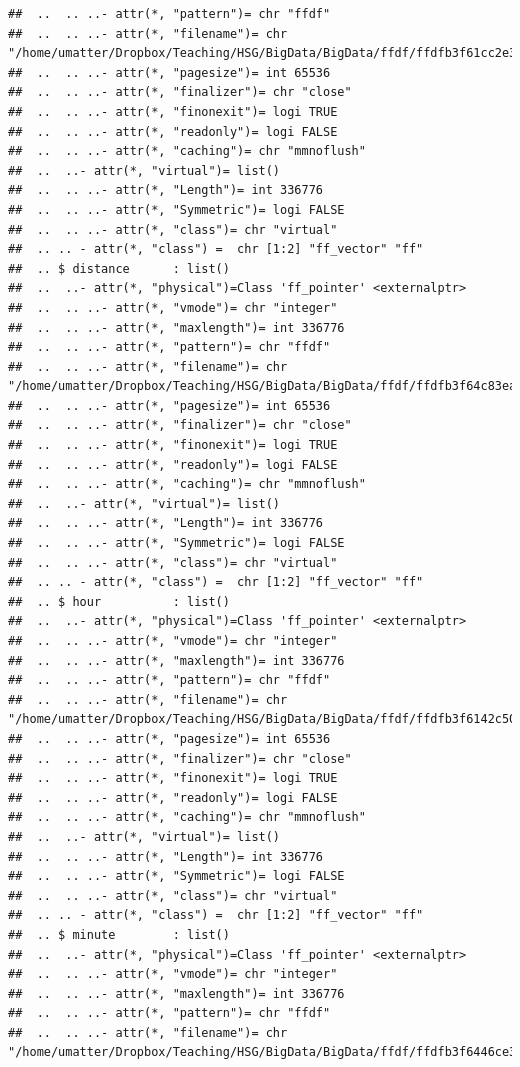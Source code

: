 \documentclass[
  12pt,
]{style/krantz}
\begin{document}
\begin{verbatim}
##  ..  .. ..- attr(*, "pattern")= chr "ffdf"
##  ..  .. ..- attr(*, "filename")= chr "/home/umatter/Dropbox/Teaching/HSG/BigData/BigData/ffdf/ffdfb3f61cc2e3dd.ff"
##  ..  .. ..- attr(*, "pagesize")= int 65536
##  ..  .. ..- attr(*, "finalizer")= chr "close"
##  ..  .. ..- attr(*, "finonexit")= logi TRUE
##  ..  .. ..- attr(*, "readonly")= logi FALSE
##  ..  .. ..- attr(*, "caching")= chr "mmnoflush"
##  ..  ..- attr(*, "virtual")= list()
##  ..  .. ..- attr(*, "Length")= int 336776
##  ..  .. ..- attr(*, "Symmetric")= logi FALSE
##  ..  .. ..- attr(*, "class")= chr "virtual"
##  .. .. - attr(*, "class") =  chr [1:2] "ff_vector" "ff"
##  .. $ distance      : list()
##  ..  ..- attr(*, "physical")=Class 'ff_pointer' <externalptr> 
##  ..  .. ..- attr(*, "vmode")= chr "integer"
##  ..  .. ..- attr(*, "maxlength")= int 336776
##  ..  .. ..- attr(*, "pattern")= chr "ffdf"
##  ..  .. ..- attr(*, "filename")= chr "/home/umatter/Dropbox/Teaching/HSG/BigData/BigData/ffdf/ffdfb3f64c83ea00.ff"
##  ..  .. ..- attr(*, "pagesize")= int 65536
##  ..  .. ..- attr(*, "finalizer")= chr "close"
##  ..  .. ..- attr(*, "finonexit")= logi TRUE
##  ..  .. ..- attr(*, "readonly")= logi FALSE
##  ..  .. ..- attr(*, "caching")= chr "mmnoflush"
##  ..  ..- attr(*, "virtual")= list()
##  ..  .. ..- attr(*, "Length")= int 336776
##  ..  .. ..- attr(*, "Symmetric")= logi FALSE
##  ..  .. ..- attr(*, "class")= chr "virtual"
##  .. .. - attr(*, "class") =  chr [1:2] "ff_vector" "ff"
##  .. $ hour          : list()
##  ..  ..- attr(*, "physical")=Class 'ff_pointer' <externalptr> 
##  ..  .. ..- attr(*, "vmode")= chr "integer"
##  ..  .. ..- attr(*, "maxlength")= int 336776
##  ..  .. ..- attr(*, "pattern")= chr "ffdf"
##  ..  .. ..- attr(*, "filename")= chr "/home/umatter/Dropbox/Teaching/HSG/BigData/BigData/ffdf/ffdfb3f6142c50de.ff"
##  ..  .. ..- attr(*, "pagesize")= int 65536
##  ..  .. ..- attr(*, "finalizer")= chr "close"
##  ..  .. ..- attr(*, "finonexit")= logi TRUE
##  ..  .. ..- attr(*, "readonly")= logi FALSE
##  ..  .. ..- attr(*, "caching")= chr "mmnoflush"
##  ..  ..- attr(*, "virtual")= list()
##  ..  .. ..- attr(*, "Length")= int 336776
##  ..  .. ..- attr(*, "Symmetric")= logi FALSE
##  ..  .. ..- attr(*, "class")= chr "virtual"
##  .. .. - attr(*, "class") =  chr [1:2] "ff_vector" "ff"
##  .. $ minute        : list()
##  ..  ..- attr(*, "physical")=Class 'ff_pointer' <externalptr> 
##  ..  .. ..- attr(*, "vmode")= chr "integer"
##  ..  .. ..- attr(*, "maxlength")= int 336776
##  ..  .. ..- attr(*, "pattern")= chr "ffdf"
##  ..  .. ..- attr(*, "filename")= chr "/home/umatter/Dropbox/Teaching/HSG/BigData/BigData/ffdf/ffdfb3f6446ce386.ff"

\end{verbatim}
\end{document}
